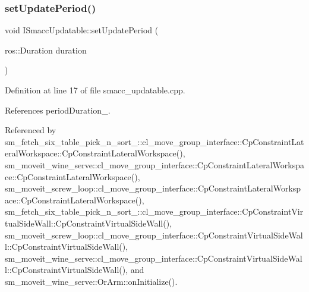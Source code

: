 \subsubsection{\texorpdfstring{set\+Update\+Period()}{setUpdatePeriod()}}
{\footnotesize\ttfamily void I\+Smacc\+Updatable\+::set\+Update\+Period (\begin{DoxyParamCaption}\item[{ros\+::\+Duration}]{duration }\end{DoxyParamCaption})}



Definition at line 17 of file smacc\+\_\+updatable.\+cpp.



References period\+Duration\+\_\+.



Referenced by sm\+\_\+fetch\+\_\+six\+\_\+table\+\_\+pick\+\_\+n\+\_\+sort\+\_\+::cl\+\_\+move\+\_\+group\+\_\+interface\+::\+Cp\+Constraint\+Lateral\+Workspace\+::\+Cp\+Constraint\+Lateral\+Workspace(), sm\+\_\+moveit\+\_\+wine\+\_\+serve\+::cl\+\_\+move\+\_\+group\+\_\+interface\+::\+Cp\+Constraint\+Lateral\+Workspace\+::\+Cp\+Constraint\+Lateral\+Workspace(), sm\+\_\+moveit\+\_\+screw\+\_\+loop\+::cl\+\_\+move\+\_\+group\+\_\+interface\+::\+Cp\+Constraint\+Lateral\+Workspace\+::\+Cp\+Constraint\+Lateral\+Workspace(), sm\+\_\+fetch\+\_\+six\+\_\+table\+\_\+pick\+\_\+n\+\_\+sort\+\_\+::cl\+\_\+move\+\_\+group\+\_\+interface\+::\+Cp\+Constraint\+Virtual\+Side\+Wall\+::\+Cp\+Constraint\+Virtual\+Side\+Wall(), sm\+\_\+moveit\+\_\+screw\+\_\+loop\+::cl\+\_\+move\+\_\+group\+\_\+interface\+::\+Cp\+Constraint\+Virtual\+Side\+Wall\+::\+Cp\+Constraint\+Virtual\+Side\+Wall(), sm\+\_\+moveit\+\_\+wine\+\_\+serve\+::cl\+\_\+move\+\_\+group\+\_\+interface\+::\+Cp\+Constraint\+Virtual\+Side\+Wall\+::\+Cp\+Constraint\+Virtual\+Side\+Wall(), and sm\+\_\+moveit\+\_\+wine\+\_\+serve\+::\+Or\+Arm\+::on\+Initialize().


